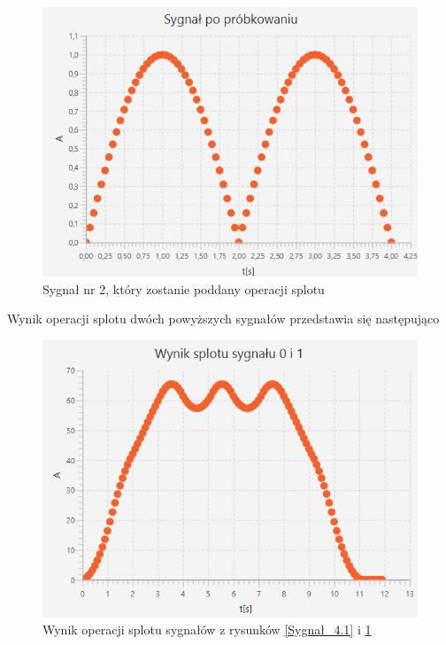 \documentclass[12pt]{article}
\begin{document}
\begin{figure}[H]
    \centering
	\includegraphics[width=\linewidth]{sygnal_po_probkowaniu_4.2.png}
    \caption{Sygnał nr 2, który zostanie poddany operacji splotu}
    \label{Sygnał_4.2}
\end{figure}

Wynik operacji splotu dwóch powyższych sygnałów przedstawia się następująco
\begin{figure}[H]
    \centering
	\includegraphics[width=\linewidth]{splot_4.1.png}
    \caption{Wynik operacji splotu sygnałów z rysunków \ref{Sygnał_4.1} i \ref{Sygnał_4.2}}
    \label{Wynik_4.1}
\end{figure}
\end{document}
